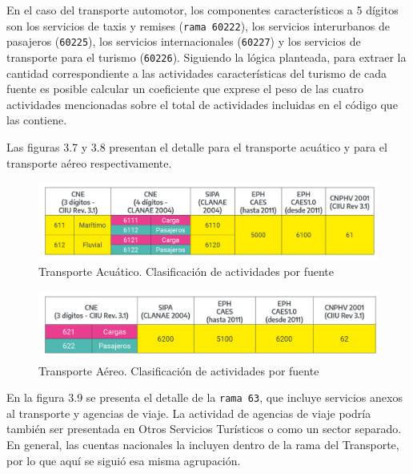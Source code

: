 \documentclass[
  openany]{book}
\begin{document}
En el caso del transporte automotor, los componentes característicos a 5 dígitos son los servicios de taxis y remises (\texttt{rama\ 60222}), los servicios interurbanos de pasajeros (\texttt{60225}), los servicios internacionales (\texttt{60227}) y los servicios de transporte para el turismo (\texttt{60226}). Siguiendo la lógica planteada, para extraer la cantidad correspondiente a las actividades características del turismo de cada fuente es posible calcular un coeficiente que exprese el peso de las cuatro actividades mencionadas sobre el total de actividades incluidas en el código que las contiene.

Las figuras 3.7 y 3.8 presentan el detalle para el transporte acuático y para el transporte aéreo respectivamente.

\begin{figure}

{\centering \includegraphics[width=1\linewidth]{imagenes/figura3.7} 

}

\caption{Transporte Acuático. Clasificación de actividades por fuente}\label{fig:empleofuentes7}
\end{figure}

\begin{figure}

{\centering \includegraphics[width=1\linewidth]{imagenes/figura3.8} 

}

\caption{Transporte Aéreo. Clasificación de actividades por fuente}\label{fig:empleofuentes8}
\end{figure}

En la figura 3.9 se presenta el detalle de la \texttt{rama\ 63}, que incluye servicios anexos al transporte y agencias de viaje. La actividad de agencias de viaje podría también ser presentada en Otros Servicios Turísticos o como un sector separado. En general, las cuentas nacionales la incluyen dentro de la rama del Transporte, por lo que aquí se siguió esa misma agrupación.
\end{document}
